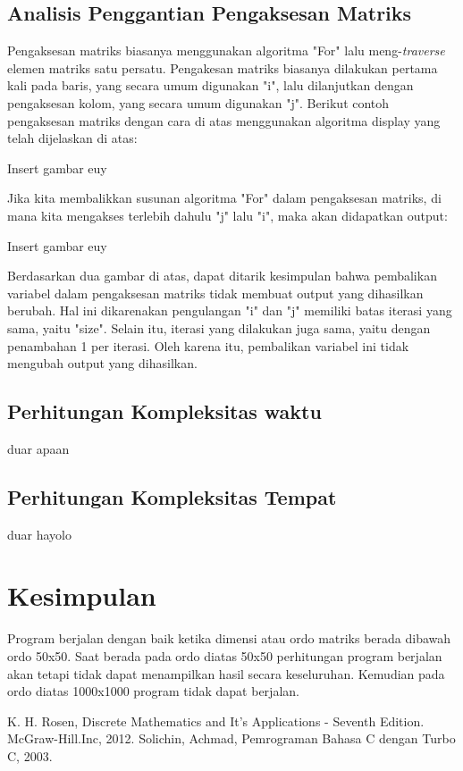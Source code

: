 \documentclass[conference]{IEEEtran}
\begin{document}
\subsection{Analisis Penggantian Pengaksesan Matriks}
Pengaksesan matriks biasanya menggunakan algoritma "For" lalu
meng-\emph{traverse} elemen matriks satu persatu. Pengakesan matriks biasanya 
dilakukan pertama kali pada baris, yang secara umum digunakan "i", lalu
dilanjutkan dengan pengaksesan kolom, yang secara umum digunakan "j". Berikut
contoh pengaksesan matriks dengan cara di atas menggunakan algoritma display
yang telah dijelaskan di atas:

Insert gambar euy

Jika kita membalikkan susunan algoritma "For" dalam pengaksesan matriks, di mana
kita mengakses terlebih dahulu "j" lalu "i", maka akan didapatkan output:

Insert gambar euy

Berdasarkan dua gambar di atas, dapat ditarik kesimpulan bahwa pembalikan variabel
dalam pengaksesan matriks tidak membuat output yang dihasilkan berubah. Hal ini dikarenakan
pengulangan "i" dan "j" memiliki batas iterasi yang sama, yaitu "size". Selain itu, iterasi
yang dilakukan juga sama, yaitu dengan penambahan 1 per iterasi. Oleh karena itu, pembalikan
variabel ini tidak mengubah output yang dihasilkan.

\subsection{Perhitungan Kompleksitas waktu}
duar apaan

\subsection{Perhitungan Kompleksitas Tempat}
duar hayolo

\section{Kesimpulan}
Program berjalan dengan baik ketika dimensi atau ordo matriks berada dibawah ordo 50x50. Saat berada pada ordo diatas 50x50 perhitungan program berjalan akan tetapi tidak dapat menampilkan hasil secara keseluruhan. Kemudian pada ordo diatas 1000x1000 program tidak dapat berjalan.

\begin{thebibliography}{00}
     K. H. Rosen, Discrete Mathematics and It’s Applications - Seventh
    Edition. McGraw-Hill.Inc, 2012.
     Solichin, Achmad, Pemrograman Bahasa C dengan Turbo C, 2003.
    \end{thebibliography}
\end{document}
